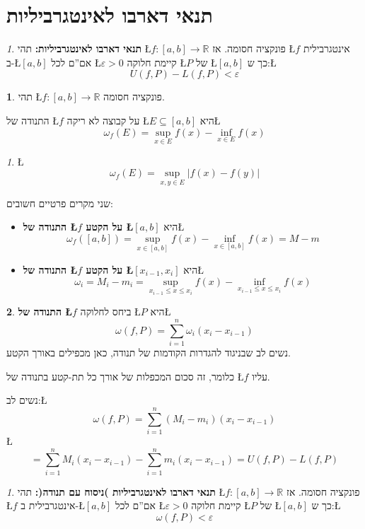 \documentclass[english,hebrew]{article}
\theoremstyle{remark}
\theoremstyle{definition}
\newtheorem*{defn*}{\protect\definitionname}
\theoremstyle{plain}
\theoremstyle{remark}
\newtheorem{claim}[thm]{\protect\claimname}
\theoremstyle{plain}
\theoremstyle{plain}
\theoremstyle{definition}
\theoremstyle{plain}
\providecommand{\claimname}{טענה}
\providecommand{\definitionname}{הגדרה}
\begin{document}
\section{תנאי דארבו לאינטגרביליות}
\begin{claim}
\textbf{תנאי דארבו לאינטגרביליות: }תהי \L{$f:\left[a,b\right]\rightarrow\mathbb{R}$}
פונקציה חסומה. אז \L{$f$} אינטגרבילית ב-\L{$\left[a,b\right]$} אם\textquotedblright ם
לכל \L{$\varepsilon>0$} קיימת חלוקה \L{$P$} של \L{$\left[a,b\right]$}
כך ש:\L{%
\[
U\left(f,P\right)-L\left(f,P\right)<\varepsilon
\]
}%
\end{claim}

\begin{defn*}
תהי \L{$f:\left[a,b\right]\rightarrow\mathbb{R}$} פונקציה חסומה. 

התנודה של \L{$f$} על קבוצה לא ריקה \L{$E\subseteq\left[a,b\right]$}
היא\L{%
\[
\omega_{f}\left(E\right)=\underset{x\in E}{\sup}f(x)-\underset{x\in E}{\inf}f(x)
\]
}%
\end{defn*}
\begin{claim}
\L{%
\[
\omega_{f}\left(E\right)=\underset{x,y\in E}{\sup}\left|f\left(x\right)-f\left(y\right)\right|
\]
}%
\end{claim}

שני מקרים פרטיים חשובים:
\begin{itemize}
\item \textbf{התנודה של \L{$f$} על הקטע \L{$\left[a,b\right]$}} היא\L{%
\[
\omega_{f}\left(\left[a,b\right]\right)=\underset{x\in\left[a,b\right]}{\sup}f(x)-\underset{x\in\left[a,b\right]}{\inf}f(x)=M-m
\]
}%
\item \textbf{התנודה של \L{$f$} על הקטע \L{$\left[x_{i-1},x_{i}\right]$}}
היא\L{%
\[
\omega_{i}=M_{i}-m_{i}=\underset{x_{i-1}\le x\le x_{i}}{\sup}f(x)-\underset{x_{i-1}\le x\le x_{i}}{\inf}f(x)
\]
}%
\end{itemize}
\begin{defn*}
\textbf{התנודה של \L{$f$} }ביחס לחלוקה \L{$P$} היא\L{%
\[
\omega\left(f,P\right)=\underset{i=1}{\overset{n}{\sum}}\omega_{i}\left(x_{i}-x_{i-1}\right)
\]
}%
נשים לב שבניגוד להגדרות הקודמות של תנודה, כאן מכפילים באורך הקטע.

כלומר, זה סכום המכפלות של אורך כל תת-קטע בתנודה של \L{$f$} עליו.

נשים לב:\L{%
\[
\omega\left(f,P\right)=\underset{i=1}{\overset{n}{\sum}}\left(M_{i}-m_{i}\right)\left(x_{i}-x_{i-1}\right)
\]
}%
\L{%
\[
=\underset{i=1}{\overset{n}{\sum}}M_{i}\left(x_{i}-x_{i-1}\right)-\underset{i=1}{\overset{n}{\sum}}m_{i}\left(x_{i}-x_{i-1}\right)=U\left(f,P\right)-L\left(f,P\right)
\]
}%
\end{defn*}
\begin{claim}
\textbf{תנאי דארבו לאינטגרביליות )ניסוח עם תנודה(: }תהי \L{$f:\left[a,b\right]\rightarrow\mathbb{R}$}
פונקציה חסומה. אז \L{$f$} אינטגרבילית ב-\L{$\left[a,b\right]$} אם\textquotedblright ם
לכל \L{$\varepsilon>0$} קיימת חלוקה \L{$P$} של \L{$\left[a,b\right]$}
כך ש:\L{%
\[
\omega\left(f,P\right)<\varepsilon
\]
}%
\end{claim}
\end{document}
